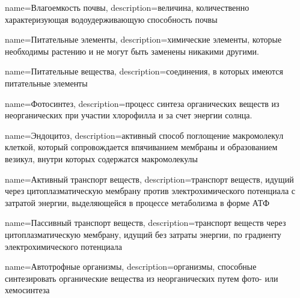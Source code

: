 




{
name={Влагоемкость почвы},
description={величина, количественно характеризующая водоудерживающую способность почвы}
}

{
name={Питательные элементы},
description={химические элементы, которые необходимы растению и не могут быть заменены никакими другими. }
}

{
name={Питательные вещества},
description={соединения, в которых имеются питательные элементы}
}

{
name={Фотосинтез},
description={процесс синтеза органических веществ из неорганических при участии хлорофилла и за счет энергии солнца.}
}

{
name={Эндоцитоз},
description={активный способ поглощение макромолекул клеткой, который сопровождается впячиванием мембраны и образованием везикул, внутри которых содержатся макромолекулы}
}

{
name={Активный транспорт веществ},
description={транспорт веществ, идущий через цитоплазматическую мембрану против электрохимического потенциала с затратой энергии, выделяющейся в процессе метаболизма в форме АТФ}
}

{
name={Пассивный транспорт веществ},
description={транспорт веществ через цитоплазматическую мембрану, идущий без затраты энергии, по градиенту электрохимического потенциала}
}

{
name={Автотрофные организмы},
description={организмы, способные синтезировать органические вещества из неорганических путем фото- или хемосинтеза}
}

